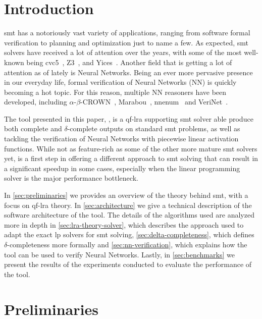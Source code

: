 \documentclass[runningheads]{llncs}
\begin{document}
\section{Introduction}

\gls{smt} has a notoriously vast variety of applications, ranging from software formal verification to planning and optimization just to name a few.
As expected, \gls{smt} solvers have received a lot of attention over the years, with some of the most well-known being cvc5~\cite{ref:cvc5}, Z3~\cite{ref:z3}, and Yices~\cite{ref:yices}.
Another field that is getting a lot of attention as of lately is Neural Networks.
Being an ever more pervasive presence in our everyday life, formal verification of Neural Networks (NN) is quickly becoming a hot topic.
For this reason, multiple NN reasoners have been developed, including $\alpha$-$\beta$-CROWN~\cite{ref:a-crown,ref:b-crown,ref:crown,ref:lirpa}, Marabou~\cite{ref:marabou}, nnenum~\cite{ref:nnenum} and VeriNet~\cite{ref:verinet}.

The tool presented in this paper, \dlinear, is a \gls{qf-lra} supporting \gls{smt} solver able produce both complete and $\delta$-complete outputs on standard \gls{smt} problems,
as well as tackling the verification of Neural Networks with piecewise linear activation functions.
While not as feature-rich as some of the other more mature \gls{smt} solvers yet, \dlinear is a first step in offering a different approach to \gls{smt} solving that can result in a significant speedup in some cases, especially when the linear programming solver is the major performance bottleneck.

In \autoref{sec:preliminaries} we provides an overview of the theory behind \gls{smt}, with a focus on \gls{qf-lra} theory.
In \autoref{sec:architecture} we give a technical description of the software architecture of the tool.
The details of the algorithms used are analyzed more in depth in \autoref{sec:lra-theory-solver}, which describes the approach used to adapt the exact \gls{lp} solvers for \gls{smt} solving, \autoref{sec:delta-completeness}, which defines $\delta$-completeness more formally and \autoref{sec:nn-verification}, which explains how the tool can be used to verify Neural Networks.
Lastly, in \autoref{sec:benchmarks} we present the results of the experiments conducted to evaluate the performance of the tool.

\section{Preliminaries}
\label{sec:preliminaries}
\end{document}
